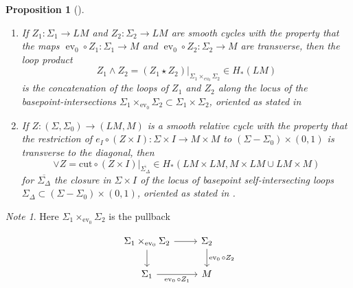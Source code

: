 \documentclass[reqno]{amsart}
\newtheorem{proposition}[theorem]{Proposition}
\theoremstyle{definition}
\theoremstyle{remark}
\newtheorem*{note}{Note}
\DeclareMathOperator{\ev}{ev}
\begin{document}
\begin{proposition}[]\cite[Propositions 3.1 and 3.7]{Hingston-Wahl}
    \label{Prop:GHUXIQL}
    \begin{enumerate}
        \item 
    If $Z_1 \colon \Sigma_1 \to LM$ and
    $Z_2 \colon \Sigma_2 \to LM$ are smooth cycles with the
    property that the maps
    $\ev_0 \circ Z_1 \colon \Sigma_1 \to M$ and
    $\ev_0 \circ Z_2 \colon \Sigma_2 \to M$ are transverse, then
    the loop product
    \[
    Z_1 \wedge Z_2 = \left( Z_1 \star Z_2 \right)|_{\Sigma_1 \times_{ev_0}
    \Sigma_2} \in H_* \left( LM \right) 
    \] 
    is the concatenation of the loops of $Z_1$ and $Z_2$ along
    the locus of the basepoint-intersections
    $\Sigma_1 \times_{\ev_0} \Sigma_2 \subset \Sigma_1 \times 
    \Sigma_2$, oriented as stated in \cite{Hingston-Wahl}
\item If $Z \colon \left( \Sigma, \Sigma_0 \right) \to 
    \left( LM, M \right) $ is a smooth relative cycle with the
    property that the restriction of $e_I \circ (Z \times I) \colon
    \Sigma \times I \to M \times M$ to $\left( \Sigma
    - \Sigma_0 \right) \times (0,1)$ is transverse to the diagonal,
    then
    \[
    \vee Z = \text{cut} \circ \left( Z \times I \right) 
    |_{\overline{\Sigma_{\Delta}}} \in H_* \left( LM \times 
    LM, M \times LM \cup  LM \times M \right) 
    \] 
    for $\overline{\Sigma_{\Delta}}$ the closure in
    $\Sigma \times I$ of the locus of basepoint self-intersecting
    loops $\Sigma_{\Delta} \subset \left( \Sigma - \Sigma_0 \right) 
    \times (0,1)$, oriented as stated in
    \cite{Hingston-Wahl}.
    \end{enumerate}
\end{proposition}

\begin{note}
    Here $\Sigma_1 \times_{\ev_0} \Sigma_2$ is the
    pullback

    \begin{equation*}
    \begin{tikzcd}
        \Sigma_1 \times_{\ev_0} \Sigma_2 \ar[r] \ar[d] & 
        \Sigma_2 \ar[d, "\ev_0 \circ Z_2"] \\
        \Sigma_1 \ar[r, "\ev_0 \circ Z_1"'] & M
    \end{tikzcd}
    \end{equation*}
    


\end{note}
\end{document}
